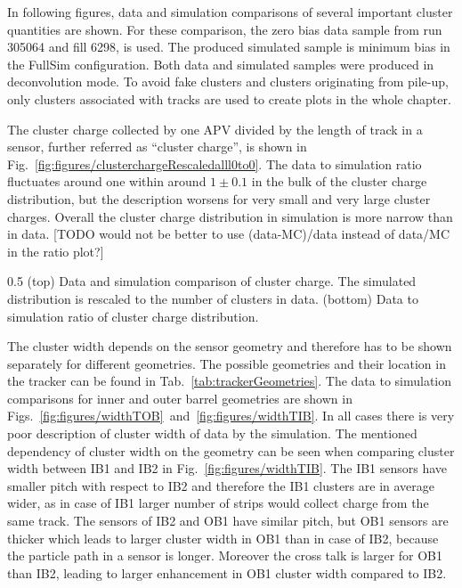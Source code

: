 In following figures, data and simulation comparisons of several important cluster quantities are shown. For these comparison, the zero bias data sample from run 305064 and fill 6298, is used. The produced simulated sample is minimum bias in the FullSim configuration. Both data and simulated samples were produced in deconvolution mode. To avoid fake clusters and clusters originating from pile-up, only clusters associated with tracks are used to create plots in the whole chapter.
 
The cluster charge collected by one APV divided by the length of track in a sensor, further referred as ``cluster charge'', is shown in Fig.~\ref{fig:figures/clusterchargeRescaledalll0to0}. The data to simulation ratio fluctuates around one within around $1 \pm 0.1$ in the bulk of the cluster charge distribution, but the description worsens for very small and very large cluster charges. Overall the cluster charge distribution in simulation is more narrow than in data. [TODO would not be better to use (data-MC)/data instead of data/MC in the ratio plot?]

                 {0.5}       %
                 { (top) Data and simulation comparison of cluster charge. The simulated distribution is rescaled to the number of clusters in data. (bottom) Data to simulation ratio of cluster charge distribution. }

The cluster width depends on the sensor geometry and therefore has to be shown separately for different geometries. The possible geometries and their location in the tracker can be found in Tab.~\ref{tab:trackerGeometries}. The data to simulation comparisons for inner and outer barrel geometries are shown in Figs.~\ref{fig:figures/widthTOB}~and~\ref{fig:figures/widthTIB}. In all cases there is very poor description of cluster width of data by the simulation. The mentioned dependency of cluster width on the geometry can be seen when comparing cluster width between IB1 and IB2 in Fig.~\ref{fig:figures/widthTIB}. The IB1 sensors have smaller pitch with respect to IB2 and therefore the IB1 clusters are in average wider, as in case of IB1 larger number of strips would collect charge from the same track. The sensors of IB2 and OB1 have similar pitch, but OB1 sensors are thicker which leads to larger cluster width in OB1 than in case of IB2, because the particle path in a sensor is longer. Moreover the cross talk is larger for OB1 than IB2, leading to larger enhancement in OB1 cluster width compared to IB2.

